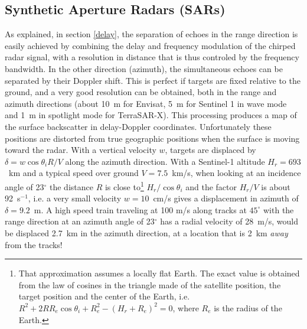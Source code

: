 \subsection{Synthetic Aperture Radars (SARs)}
As  explained, in section \ref{delay}, the separation of echoes in the range direction is easily achieved by combining the delay and frequency modulation of 
the chirped radar signal, with a resolution in distance that is thus controled by the frequency bandwidth. 
In the other direction (azimuth), the simultaneous echoes can be separated by their Doppler shift. 
This is perfect if targets are fixed relative to the ground, and a 
very good resolution can be obtained, both in the range and azimuth directions (about 10~m for Envisat, 5~m for Sentinel 1 in wave mode and 1~m in spotlight mode for TerraSAR-X). This processing 
produces a  map of the surface 
backscatter in delay-Doppler coordinates. Unfortunately these positions are distorted from  true geographic positions when the surface is moving toward the 
radar. With a vertical velocity $w$, targets are displaced by $\delta=w \cos \theta_i  R/V$ along the azimuth direction. With a Sentinel-1 altitude $H_r = 693$~km  and a typical speed over ground $V=7.5$~km/s, when looking at an incidence angle of 23$^\circ$ the distance $R$ is close to\footnote{That approximation assumes a locally flat Earth. The exact value is obtained from the law of cosines in the triangle made of the satellite position, the target position and the center of the Earth, i.e. $R^2 + 2 R R_e \cos \theta_i +R_e^2 - (H_r +R_e)^2=0$, where $R_e$ is the radius of the Earth.} $H_r/\cos \theta_i$ and the 
factor $H_r/V$ is about 92~s$^{-1}$, i.e. a very small velocity  $w= 10$~cm/s gives a displacement in azimuth of $\delta=9.2$~m. 
A high speed train traveling at 100 m/s along tracks at $45^\circ$ with the range direction at an azimuth angle of 23$^\circ$ has a radial velocity of 28~m/s, would be displaced 2.7~km in the azimuth direction, at a location that is 2~km \textit{away} from the tracks!
%
%



